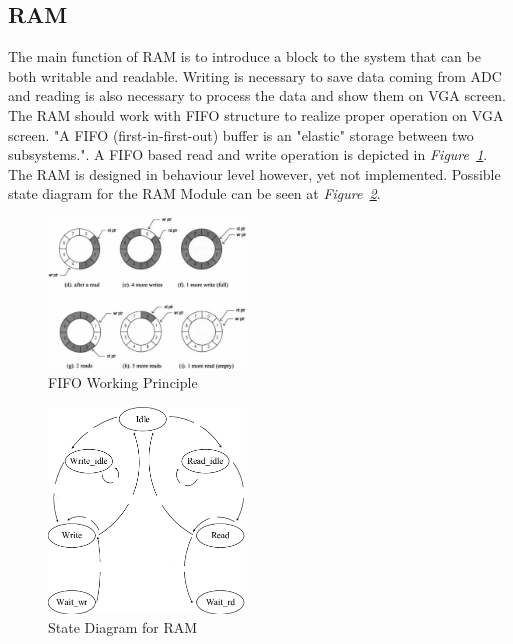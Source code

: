 \documentclass[paper]{IEEEtran}
\begin{document}
\subsection{RAM} \- \indent
	The main function of RAM is to introduce a block to the system that can be both writable and readable. Writing is necessary to save data coming from ADC and reading is also necessary to process the data and show them on VGA screen. The RAM should work with FIFO structure to realize proper operation on VGA screen. "A FIFO (first-in-first-out) buffer is an "elastic" storage between two subsystems."\cite{b3}. A FIFO based read and write operation is depicted in \textit{Figure~\ref{fig:fifo_diagram}}. The RAM is designed in behaviour level however, yet not implemented. Possible state diagram for the RAM Module can be seen at \textit{Figure~\ref{fig:RAM State}}.
	
	\begin{figure}[t!]
		\setlength{\unitlength}{\textwidth}
		\center 
		\includegraphics[width=0.47\textwidth]{fifo_diagram}
		\caption{\label{fig:fifo_diagram}FIFO Working Principle\cite{b3}}
	\end{figure}

\begin{figure}[h!]
			\setlength{\unitlength}{\textwidth}
			\center 
			\includegraphics[width=0.47\textwidth]{RAM_state}
			\caption{\label{fig:RAM State} State Diagram for RAM}
\end{figure}
		
\end{document}
